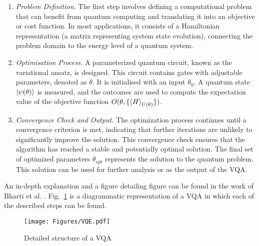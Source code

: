 \begin{enumerate}\itemsep0em

\item[1.]  \textit{Problem Definition.} The first step involves defining a computational problem that can benefit from quantum computing and translating it into an objective or cost function. In most applications, it consists of a Hamiltonian representation (a matrix representing system state evolution), connecting the problem domain to the energy level of a quantum system.

\item[2.]  \textit{Optimisation Process.} A parameterized quantum circuit, known as the variational ansatz, is designed. This circuit contains gates with adjustable parameters, denoted as $\theta$. It is initialised with an input $\theta_0$. A quantum state $\ket{\psi(\theta)}$ is measured, and the outcomes are used to compute the expectation value of the objective function $O(\theta, \{\braket{H}_{U(\theta)}\})$.

\item[3--4.]  \textit{Convergence Check and Output.} The optimization process continues until a convergence criterion is met, indicating that further iterations are unlikely to significantly improve the solution. This convergence check ensures that the algorithm has reached a stable and potentially optimal solution. The final set of optimized parameters $\theta_{opt}$ represents the solution to the quantum problem. This solution can be used for further analysis or as the output of the VQA.

\end{enumerate}

An in-depth explanation and a figure detailing figure can be found in the work of Bharti et al. \cite{bharti_noisy_2022}. Fig.~\ref{VQE} \cite{tilly_variational_2022} is a diagrammatic representation of a VQA in which each of the described steps can be found.

\begin{figure}[hbt!]
\texttt{[image: Figures/VQE.pdf]}
\caption{Detailed structure of a VQA \cite{tilly_variational_2022}}
\label{VQE}
\end{figure}